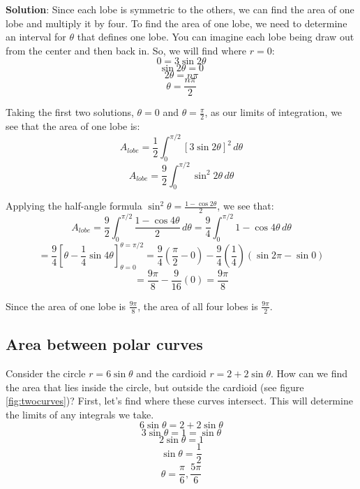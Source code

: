 \textbf{Solution}: Since each lobe is symmetric to the others, we can find the 
area of one lobe and multiply it by four. To find the area of one lobe, we 
need to determine an interval for $\theta$ that defines one lobe. You can 
imagine each lobe being draw out from the center and then back in. So, we will 
find where $r = 0$:
$$0 = 3\sin{2\theta}$$
$$\sin{2\theta} = 0$$
$$2\theta = n\pi$$
$$\theta = \frac{n\pi}{2}$$

Taking the first two solutions, $\theta = 0$ and $\theta = \frac{\pi}{2}$, as our 
limits of integration, we see that the area of one lobe is:
$$A_{lobe} = \frac{1}{2} \int_0^{\pi/2} \left[3 \sin{2 \theta} \right]^2\,d
\theta$$
$$A_{lobe} = \frac{9}{2} \int_0^{\pi/2} \sin^2{2\theta}\,d\theta$$

Applying the half-angle formula $\sin^2{\theta} = \frac{1 - \cos{2\theta}}{2}$, 
we see that:
$$A_{lobe} = \frac{9}{2} \int_0^{\pi/2} \frac{1 - \cos{4\theta}}{2}\,d\theta = 
\frac{9}{4} \int_0^{\pi / 2} 1 - \cos{4\theta} \, d\theta$$
$$= \frac{9}{4} \left[ \theta - \frac{1}{4} \sin{4\theta} \right]_{\theta = 0}^
{\theta = \pi / 2} = \frac{9}{4} \left( \frac{\pi}{2} - 0 \right) - \frac{9}{4}
\left( \frac{1}{4} \right) \left( \sin{2\pi} - \sin{0} \right)$$
$$= \frac{9\pi}{8} - \frac{9}{16} \left( 0 \right) = \frac{9\pi}{8}$$

Since the area of one lobe is $\frac{9\pi}{8}$, the area of all four lobes is 
$\frac{9\pi}{2}$.

\subsection{Area between polar curves}
Consider the circle $r = 6\sin{\theta}$ and the cardioid $r = 2 + 2\sin{\theta}
$. How can we find the area that lies inside the circle, but outside the 
cardioid (see figure \ref{fig:twocurves})? First, let's find where these curves
intersect. This will determine the limits of any integrals we take.
$$6\sin{\theta} = 2 + 2\sin{\theta}$$
$$3\sin{\theta} = 1 = \sin{\theta}$$
$$2\sin{\theta} = 1$$
$$\sin{\theta} = \frac{1}{2}$$
$$\theta = \frac{\pi}{6}, \frac{5\pi}{6}$$

